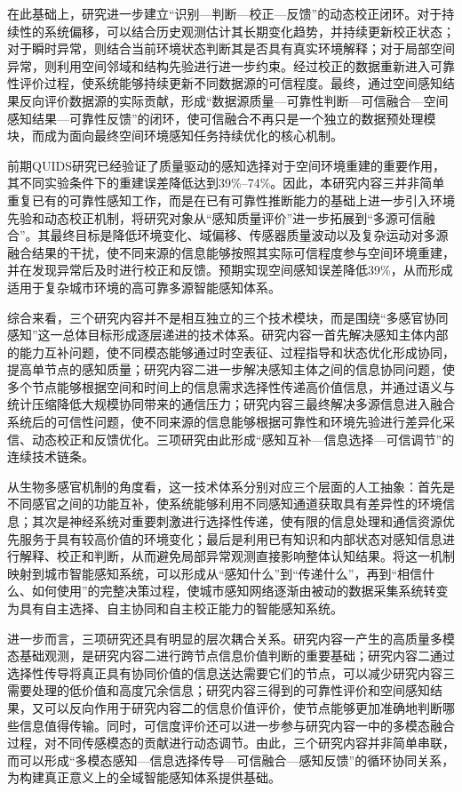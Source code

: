 在此基础上，研究进一步建立“识别—判断—校正—反馈”的动态校正闭环。对于持续性的系统偏移，可以结合历史观测估计其长期变化趋势，并持续更新校正状态；对于瞬时异常，则结合当前环境状态判断其是否具有真实环境解释；对于局部空间异常，则利用空间邻域和结构先验进行进一步约束。经过校正的数据重新进入可靠性评价过程，使系统能够持续更新不同数据源的可信程度。最终，通过空间感知结果反向评价数据源的实际贡献，形成“数据源质量—可靠性判断—可信融合—空间感知结果—可靠性反馈”的闭环，使可信融合不再只是一个独立的数据预处理模块，而成为面向最终空间环境感知任务持续优化的核心机制。

前期QUIDS研究已经验证了质量驱动的感知选择对于空间环境重建的重要作用，其不同实验条件下的重建误差降低达到39\%–74\%。因此，本研究内容三并非简单重复已有的可靠性感知工作，而是在已有可靠性推断能力的基础上进一步引入环境先验和动态校正机制，将研究对象从“感知质量评价”进一步拓展到“多源可信融合”。其最终目标是降低环境变化、域偏移、传感器质量波动以及复杂运动对多源融合结果的干扰，使不同来源的信息能够按照其实际可信程度参与空间环境重建，并在发现异常后及时进行校正和反馈。预期实现空间感知误差降低39\%，从而形成适用于复杂城市环境的高可靠多源智能感知体系。

综合来看，三个研究内容并不是相互独立的三个技术模块，而是围绕“多感官协同感知”这一总体目标形成逐层递进的技术体系。研究内容一首先解决感知主体内部的能力互补问题，使不同模态能够通过时空表征、过程指导和状态优化形成协同，提高单节点的感知质量；研究内容二进一步解决感知主体之间的信息协同问题，使多个节点能够根据空间和时间上的信息需求选择性传递高价值信息，并通过语义与统计压缩降低大规模协同带来的通信压力；研究内容三最终解决多源信息进入融合系统后的可信性问题，使不同来源的信息能够根据可靠性和环境先验进行差异化采信、动态校正和反馈优化。三项研究由此形成“感知互补—信息选择—可信调节”的连续技术链条。

从生物多感官机制的角度看，这一技术体系分别对应三个层面的人工抽象：首先是不同感官之间的功能互补，使系统能够利用不同感知通道获取具有差异性的环境信息；其次是神经系统对重要刺激进行选择性传递，使有限的信息处理和通信资源优先服务于具有较高价值的环境变化；最后是利用已有知识和内部状态对感知信息进行解释、校正和判断，从而避免局部异常观测直接影响整体认知结果。将这一机制映射到城市智能感知系统，可以形成从“感知什么”到“传递什么”，再到“相信什么、如何使用”的完整决策过程，使城市感知网络逐渐由被动的数据采集系统转变为具有自主选择、自主协同和自主校正能力的智能感知系统。

进一步而言，三项研究还具有明显的层次耦合关系。研究内容一产生的高质量多模态基础观测，是研究内容二进行跨节点信息价值判断的重要基础；研究内容二通过选择性传导将真正具有协同价值的信息送达需要它们的节点，可以减少研究内容三需要处理的低价值和高度冗余信息；研究内容三得到的可靠性评价和空间感知结果，又可以反向作用于研究内容二的信息价值评价，使节点能够更加准确地判断哪些信息值得传输。同时，可信度评价还可以进一步参与研究内容一中的多模态融合过程，对不同传感模态的贡献进行动态调节。由此，三个研究内容并非简单串联，而可以形成“多模态感知—信息选择传导—可信融合—感知反馈”的循环协同关系，为构建真正意义上的全域智能感知体系提供基础。

